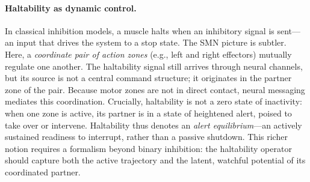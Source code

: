 \begin{description}
\paragraph{Haltability as dynamic control.} In classical inhibition models, a muscle halts when an inhibitory signal is sent—an input that drives the system to a stop state.  The SMN picture is subtler. Here, a \emph{coordinate pair of action zones} (e.g., left and right effectors) mutually regulate one another.  The haltability signal still arrives through neural channels, but its source is not a central command structure; it originates in the partner zone of the pair.  Because motor zones are not in direct contact, neural messaging mediates this coordination.  Crucially, haltability is not a zero state of inactivity: when one zone is active, its partner is in a state of heightened alert, poised to take over or intervene.  Haltability thus denotes an \emph{alert equilibrium}—an actively sustained readiness to interrupt, rather than a passive shutdown.  This richer notion requires a formalism beyond binary inhibition: the haltability operator should capture both the active trajectory and the latent, watchful potential of its coordinated partner.  


\end{description}
